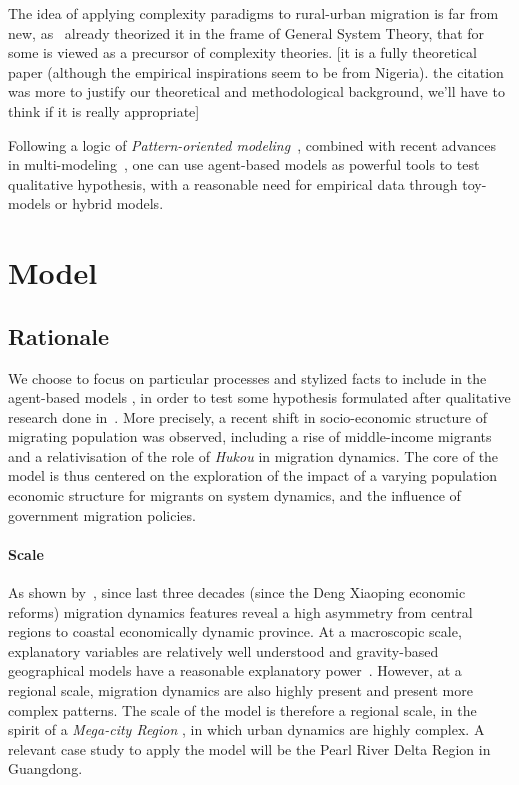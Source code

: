 The idea of applying complexity paradigms to rural-urban migration is far from new, as~\cite{mabogunje1970systems} already theorized it in the frame of General System Theory, that for some is viewed as a precursor of complexity theories. [it is a fully theoretical paper (although the empirical inspirations seem to be from Nigeria). the citation was more to justify our theoretical and methodological background, we'll have to think if it is really appropriate]

Following a logic of \emph{Pattern-oriented modeling}~\cite{grimm2005pattern}, combined with recent advances in multi-modeling~\cite{cottineau2016back}, one can use agent-based models as powerful tools to test qualitative hypothesis, with a reasonable need for empirical data through toy-models or hybrid models.



\section{Model}

\subsection{Rationale}

We choose to focus on particular processes and stylized facts to include in the agent-based models , in order to test some hypothesis formulated after qualitative research done in~\cite{losavio2016analyser}. More precisely, a recent shift in socio-economic structure of migrating population was observed, including a rise of middle-income migrants and a relativisation of the role of \emph{Hukou} in migration dynamics. The core of the model is thus centered on the exploration of the impact of a varying population economic structure for migrants on system dynamics, and the influence of government migration policies.

\paragraph{Scale} As shown by~\cite{chan2012migration}, since last three decades (since the Deng Xiaoping economic reforms) migration dynamics features reveal a high asymmetry from central regions to coastal economically dynamic province. At a macroscopic scale, explanatory variables are relatively well understood and gravity-based geographical models have a reasonable explanatory power~\cite{fan2005modeling}. However, at a regional scale, migration dynamics are also highly present and present more complex patterns. The scale of the model is therefore a regional scale, in the spirit of a \emph{Mega-city Region} \cite{hall2006polycentric}, in which urban dynamics are highly complex. A relevant case study to apply the model will be the Pearl River Delta Region in Guangdong.

